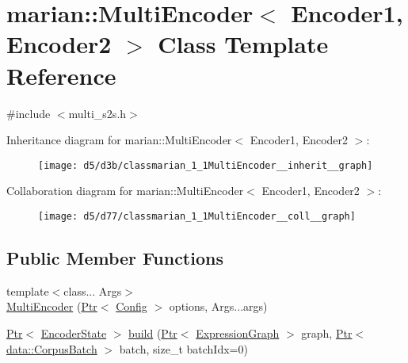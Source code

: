 \hypertarget{classmarian_1_1MultiEncoder}{}\section{marian\+:\+:Multi\+Encoder$<$ Encoder1, Encoder2 $>$ Class Template Reference}
\label{classmarian_1_1MultiEncoder}


{\ttfamily \#include $<$multi\+\_\+s2s.\+h$>$}



Inheritance diagram for marian\+:\+:Multi\+Encoder$<$ Encoder1, Encoder2 $>$\+:
\nopagebreak
\begin{figure}[H]
\begin{center}
\leavevmode
\texttt{[image: d5/d3b/classmarian\_1\_1MultiEncoder\_\_inherit\_\_graph]}
\end{center}
\end{figure}


Collaboration diagram for marian\+:\+:Multi\+Encoder$<$ Encoder1, Encoder2 $>$\+:
\nopagebreak
\begin{figure}[H]
\begin{center}
\leavevmode
\texttt{[image: d5/d77/classmarian\_1\_1MultiEncoder\_\_coll\_\_graph]}
\end{center}
\end{figure}
\subsection*{Public Member Functions}
\begin{DoxyCompactItemize}
\item 
{\footnotesize template$<$class... Args$>$ }\\\hyperlink{classmarian_1_1MultiEncoder_a801e9b9aee52ce4018c93aae91a783f2}{Multi\+Encoder} (\hyperlink{namespacemarian_ad1a373be43a00ef9ce35666145137b08}{Ptr}$<$ \hyperlink{classmarian_1_1Config}{Config} $>$ options, Args...\+args)
\item 
\hyperlink{namespacemarian_ad1a373be43a00ef9ce35666145137b08}{Ptr}$<$ \hyperlink{classmarian_1_1EncoderState}{Encoder\+State} $>$ \hyperlink{classmarian_1_1MultiEncoder_af841e028f2034309a7e13a31ea0700ea}{build} (\hyperlink{namespacemarian_ad1a373be43a00ef9ce35666145137b08}{Ptr}$<$ \hyperlink{classmarian_1_1ExpressionGraph}{Expression\+Graph} $>$ graph, \hyperlink{namespacemarian_ad1a373be43a00ef9ce35666145137b08}{Ptr}$<$ \hyperlink{classmarian_1_1data_1_1CorpusBatch}{data\+::\+Corpus\+Batch} $>$ batch, size\+\_\+t batch\+Idx=0)
\end{DoxyCompactItemize}
